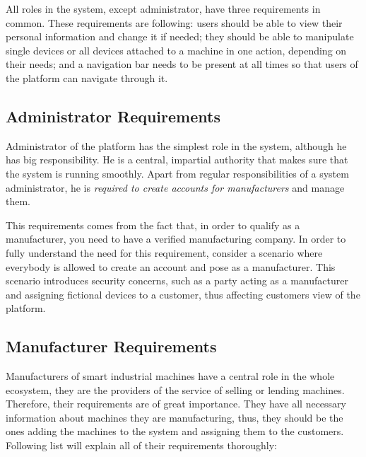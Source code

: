 All roles in the system, except administrator, have three requirements in common. These requirements are following: users should be able to view their personal information and change it if needed; they should be able to manipulate single devices or all devices attached to a machine in one action, depending on their needs; and a navigation bar needs to be present at all times so that users of the platform can navigate through it.

\subsection{Administrator Requirements}

Administrator of the platform has the simplest role in the system, although he has big responsibility. He is a central, impartial authority that makes sure that the system is running smoothly. Apart from regular responsibilities of a system administrator, he is \emph{required to create accounts for manufacturers} and manage them.

This requirements comes from the fact that, in order to qualify as a manufacturer, you need to have a verified manufacturing company. In order to fully understand the need for this requirement, consider a scenario where everybody is allowed to create an account and pose as a manufacturer. This scenario introduces security concerns, such as a party acting as a manufacturer and assigning fictional devices to a customer, thus affecting customers view of the platform.

\subsection{Manufacturer Requirements}

Manufacturers of smart industrial machines have a central role in the whole ecosystem, they are the providers of the service of selling or lending machines. Therefore, their requirements are of great importance. They have all necessary information about machines they are manufacturing, thus, they should be the ones adding the machines to the system and assigning them to the customers. Following list will explain all of their requirements thoroughly:

